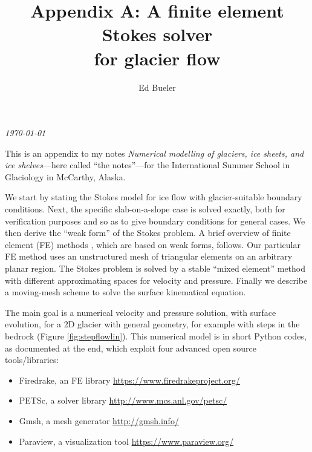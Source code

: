 \documentclass[letterpaper,final,12pt,reqno]{amsart}
\begin{document}
\graphicspath{{figures/}}

\title[Appendix A]{Appendix A: A finite element Stokes solver \\ for glacier flow}

\author{Ed Bueler}

\maketitle

\vspace{-8mm}
\begin{center}
\footnotesize
\emph{\today}
\end{center}

\thispagestyle{empty}
\bigskip

\renewcommand{\theequation}{A\arabic{equation}}

This is an appendix to my notes \emph{Numerical modelling of glaciers, ice sheets, and ice shelves}---here called ``the notes''---for the International Summer School in Glaciology in McCarthy, Alaska.

We start by stating the Stokes model for ice flow with glacier-suitable boundary conditions.  Next, the specific slab-on-a-slope case is solved exactly, both for verification purposes and so as to give boundary conditions for general cases.  We then derive the ``weak form'' of the Stokes problem.  A brief overview of finite element (FE) methods \cite{Elmanetal2014}, which are based on weak forms, follows.  Our particular FE method uses an unstructured mesh of triangular elements on an arbitrary planar region.  The Stokes problem is solved by a stable ``mixed element'' method with different approximating spaces for velocity and pressure.  Finally we describe a moving-mesh scheme to solve the surface kinematical equation.

The main goal is a numerical velocity and pressure solution, with surface evolution, for a 2D glacier with general geometry, for example with steps in the bedrock (Figure \ref{fig:stepflowlin}).  This numerical model is in short Python codes, as documented at the end, which exploit four advanced open source tools/libraries:
\begin{itemize}
\item Firedrake, an FE library \hfill \url{https://www.firedrakeproject.org/}
\item PETSc, a solver library \hfill \url{http://www.mcs.anl.gov/petsc/}
\item Gmsh, a mesh generator \hfill \url{http://gmsh.info/}
\item Paraview, a visualization tool \hfill \url{https://www.paraview.org/}
\end{itemize}
\end{document}
